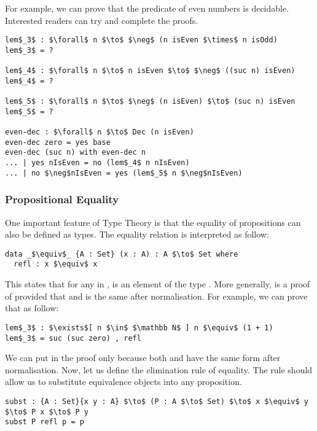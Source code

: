 \par For example, we can prove that the predicate of even numbers is
decidable. Interested readers can try and complete the proofs. 
\begin{lstlisting}[mathescape=true,xleftmargin=.3\textwidth]
lem$_3$ : $\forall$ n $\to$ $\neg$ (n isEven $\times$ n isOdd)
lem$_3$ = ?

lem$_4$ : $\forall$ n $\to$ n isEven $\to$ $\neg$ ((suc n) isEven)
lem$_4$ = ?

lem$_5$ : $\forall$ n $\to$ $\neg$ (n isEven) $\to$ (suc n) isEven
lem$_5$ = ?

even-dec : $\forall$ n $\to$ Dec (n isEven)
even-dec zero = yes base
even-dec (suc n) with even-dec n
... | yes nIsEven = no (lem$_4$ n nIsEven)
... | no $\neg$nIsEven = yes (lem$_5$ n $\neg$nIsEven)
\end{lstlisting}


\subsubsection{Propositional Equality} 
\par One important feature of Type Theory is
that the equality of propositions can also be defined as types. The
equality relation is interpreted as follow:
\begin{lstlisting}[mathescape=true,xleftmargin=.3\textwidth]
data _$\equiv$_ {A : Set} (x : A) : A $\to$ Set where
  refl : x $\equiv$ x
\end{lstlisting}

\par This states that for any  in ,  is an
element of the type . More generally,  is a
proof of  provided that  and  is the same
after normalisation. For example, we can prove that  as follow:
\begin{lstlisting}[mathescape=true,xleftmargin=.3\textwidth]
lem$_3$ : $\exists$[ n $\in$ $\mathbb N$ ] n $\equiv$ (1 + 1)
lem$_3$ = suc (suc zero) , refl
\end{lstlisting}

\par We can put  in the proof only because both
 and  have the same form after
normalisation. Now, let us define the elimination rule of
equality. The rule should allow us to substitute equivalence objects
into any proposition. 
\begin{lstlisting}[mathescape=true,xleftmargin=.3\textwidth]
subst : {A : Set}{x y : A} $\to$ (P : A $\to$ Set) $\to$ x $\equiv$ y $\to$ P x $\to$ P y
subst P refl p = p 
\end{lstlisting}

